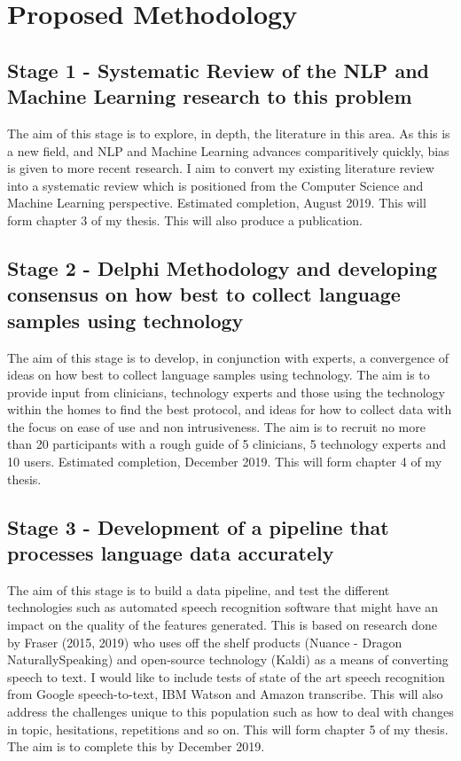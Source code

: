 \documentclass[11pt]{article}
\begin{document}
\section*{Proposed Methodology}
\subsection*{Stage 1 - Systematic Review of the NLP and Machine Learning research to this problem}
The aim of this stage is to explore, in depth, the literature in this area. As this is a new field, and NLP and Machine Learning advances comparitively quickly, bias is given to more recent research. I aim to convert my existing literature review into a systematic review which is positioned from the Computer Science and Machine Learning perspective. Estimated completion, August 2019. This will form chapter 3 of my thesis. This will also produce a publication.

\subsection*{Stage 2 - Delphi Methodology and developing consensus on how best to collect language samples using technology}
The aim of this stage is to develop, in conjunction with experts, a convergence of ideas on how best to collect language samples using technology. The aim is to provide input from clinicians, technology experts and those using the technology within the homes to find the best protocol, and ideas for how to collect data with the focus on ease of use and non intrusiveness. The aim is to recruit no more than 20 participants with a rough guide of 5 clinicians, 5 technology experts and 10 users. Estimated completion, December 2019. This will form chapter 4 of my thesis.

\subsection*{Stage 3 - Development of a pipeline that processes language data accurately}
The aim of this stage is to build a data pipeline, and test the different technologies such as automated speech recognition software that might have an impact on the quality of the features generated. This is based on research done by Fraser (2015, 2019) who uses off the shelf products (Nuance - Dragon NaturallySpeaking) and open-source technology (Kaldi) as a means of converting speech to text. I would like to include tests of state of the art speech recognition from Google speech-to-text, IBM Watson and Amazon transcribe. This will also address the challenges unique to this population such as how to deal with changes in topic, hesitations, repetitions and so on. This will form chapter 5 of my thesis. The aim is to complete this by December 2019.
\end{document}

